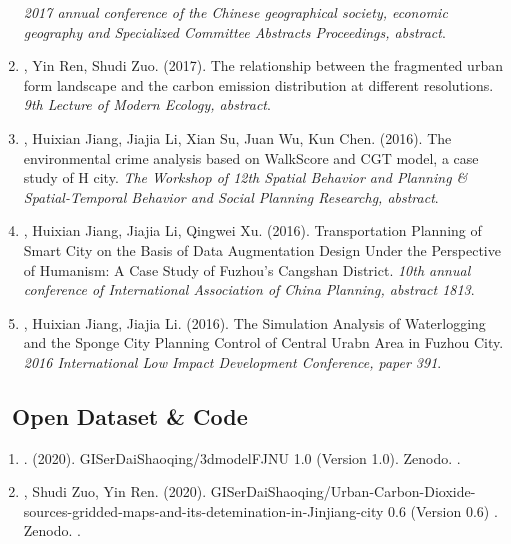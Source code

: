 \begin{enumerate}
    \textit{2017 annual conference of the Chinese geographical society, economic geography and Specialized Committee Abstracts Proceedings, abstract}.
\item
    \Shaoqing, Yin Ren, Shudi Zuo. (2017).
    The relationship between the fragmented urban form landscape and the carbon emission distribution at different resolutions.
    \textit{9th Lecture of Modern Ecology, abstract}.
\item
    \Shaoqing, Huixian Jiang, Jiajia Li, Xian Su, Juan Wu, Kun Chen. (2016).
    The environmental crime analysis based on WalkScore and CGT model, a case study of H city.
    \textit{The Workshop of 12th Spatial Behavior and Planning \& Spatial-Temporal Behavior and Social Planning Researchg, abstract}.
\item
    \Shaoqing, Huixian Jiang, Jiajia Li, Qingwei Xu. (2016).
    Transportation Planning of Smart City on the Basis of Data Augmentation Design Under the Perspective of Humanism: A Case Study of Fuzhou's Cangshan District.
    \textit{10th annual conference of International Association of China Planning, abstract 1813}.
\item
    \Shaoqing, Huixian Jiang, Jiajia Li. (2016).
    The Simulation Analysis of Waterlogging and the Sponge City Planning Control of Central Urabn Area in Fuzhou City.
    \textit{2016 International Low Impact Development Conference, paper 391}.
\end{enumerate}

\subsection*{\texorpdfstring{\faBook\ Open Dataset \& Code}{Open Dataset \& Code}}
\begin{enumerate}
\item
   \Shaoqing. (2020).
    GISerDaiShaoqing/3dmodelFJNU 1.0 (Version 1.0). Zenodo. 
    .
\item
   \Shaoqing, Shudi Zuo, Yin Ren. (2020).
    GISerDaiShaoqing/Urban-Carbon-Dioxide-sources-gridded-maps-and-its-detemination-in-Jinjiang-city 0.6 (Version 0.6) . Zenodo. 
    .
\end{enumerate}

